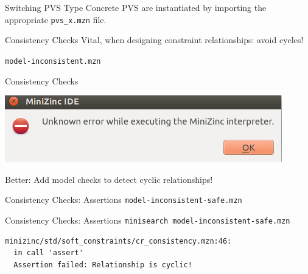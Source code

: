 \documentclass[10pt,xcolor={dvipsnames},fleqn]{beamer}
\begin{document}
\begin{frame}[fragile]{Switching PVS Type}
Concrete PVS are instantiated by importing the appropriate \texttt{pvs\_x.mzn} file.

\end{frame}

\begin{frame}[fragile]{Consistency Checks}
Vital, when designing constraint relationships: \alert{avoid cycles!}

\texttt{model-inconsistent.mzn}

\end{frame}

\begin{frame}[fragile]{Consistency Checks}
\begin{center}
\includegraphics[width=.7\textwidth]{img/errorMz.png}
\end{center}
Better: Add model checks to detect cyclic relationships!
\end{frame}

\begin{frame}[fragile]{Consistency Checks: Assertions}
\texttt{model-inconsistent-safe.mzn}

\end{frame}

\begin{frame}[fragile]{Consistency Checks: Assertions}
\texttt{minisearch model-inconsistent-safe.mzn}

\vspace*{2ex}

\begin{verbatim}
minizinc/std/soft_constraints/cr_consistency.mzn:46:
  in call 'assert'
  Assertion failed: Relationship is cyclic!

\end{verbatim}

\end{frame}
\end{document}
